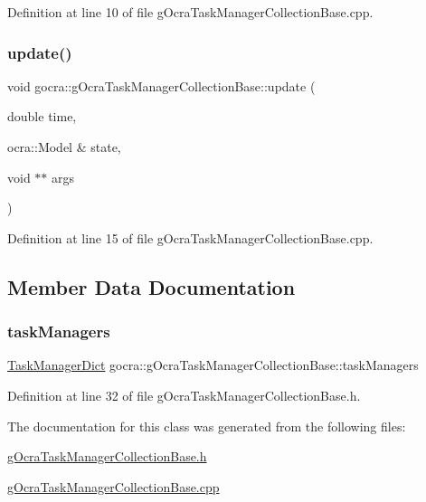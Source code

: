 Definition at line 10 of file g\+Ocra\+Task\+Manager\+Collection\+Base.\+cpp.

\hypertarget{classgocra_1_1gOcraTaskManagerCollectionBase_a08764673857307135233d7a69ad49a69}{}\label{classgocra_1_1gOcraTaskManagerCollectionBase_a08764673857307135233d7a69ad49a69} 
\subsubsection{\texorpdfstring{update()}{update()}}
{\footnotesize\ttfamily void gocra\+::g\+Ocra\+Task\+Manager\+Collection\+Base\+::update (\begin{DoxyParamCaption}\item[{double}]{time,  }\item[{ocra\+::\+Model \&}]{state,  }\item[{void $\ast$$\ast$}]{args }\end{DoxyParamCaption})}



Definition at line 15 of file g\+Ocra\+Task\+Manager\+Collection\+Base.\+cpp.



\subsection{Member Data Documentation}
\hypertarget{classgocra_1_1gOcraTaskManagerCollectionBase_a247b32be87662be87239195b726fabca}{}\label{classgocra_1_1gOcraTaskManagerCollectionBase_a247b32be87662be87239195b726fabca} 
\subsubsection{\texorpdfstring{task\+Managers}{taskManagers}}
{\footnotesize\ttfamily \hyperlink{namespacegocra_ad407175473be2e361f2937acf73ca06c}{Task\+Manager\+Dict} gocra\+::g\+Ocra\+Task\+Manager\+Collection\+Base\+::task\+Managers\hspace{0.3cm}{\ttfamily [protected]}}



Definition at line 32 of file g\+Ocra\+Task\+Manager\+Collection\+Base.\+h.



The documentation for this class was generated from the following files\+:\begin{DoxyCompactItemize}
\item 
\hyperlink{gOcraTaskManagerCollectionBase_8h}{g\+Ocra\+Task\+Manager\+Collection\+Base.\+h}\item 
\hyperlink{gOcraTaskManagerCollectionBase_8cpp}{g\+Ocra\+Task\+Manager\+Collection\+Base.\+cpp}\end{DoxyCompactItemize}
